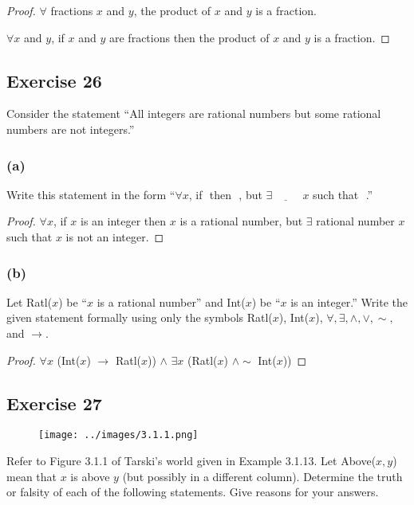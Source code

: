 \documentclass[14pt]{extarticle}
\newcommand{\fbl}{\underline{\hspace{1cm}}\,\,}
\newcommand{\fa}{\forall}
\newcommand{\te}{\exists}
\begin{document}
\begin{proof}
    $\fa$ fractions $x$ and $y$, the product of $x$ and $y$ is a fraction.

    $\fa x$ and $y$, if $x$ and $y$ are fractions then the product of $x$ and $y$ is a fraction.
\end{proof}

\subsection{Exercise 26}
Consider the statement “All integers are rational numbers but some rational numbers are not integers.”

\subsubsection{(a)}
Write this statement in the form “$\fa x$, if \fbl then \fbl, but $\te \fbl x$ such that \fbl.”

\begin{proof}
    $\fa x$, if $x$ is an integer then $x$ is a rational number, but $\te$ rational number $x$ such that $x$ is not an integer.
\end{proof}

\subsubsection{(b)}
Let Ratl($x$) be “$x$ is a rational number” and Int($x$) be “$x$ is an integer.” Write the given statement formally using only the symbols Ratl($x$), Int($x$), $\fa, \te, \wedge, \vee, \sim,$ and $\to$.

\begin{proof}
    $\fa x$ (Int($x$) $\to$ Ratl($x$)) $\wedge$ $\te x$ (Ratl($x$) $\wedge \sim$ Int($x$))
\end{proof}

\subsection{Exercise 27}
\begin{figure}[ht!]
    \centering
    \texttt{[image: ../images/3.1.1.png]}
\end{figure}

Refer to Figure 3.1.1 of Tarski’s world given in Example 3.1.13. Let Above($x, y$) mean that $x$ is above $y$ (but possibly in a different column). Determine the truth or falsity of each of the following statements. Give reasons for your answers.
\end{document}
